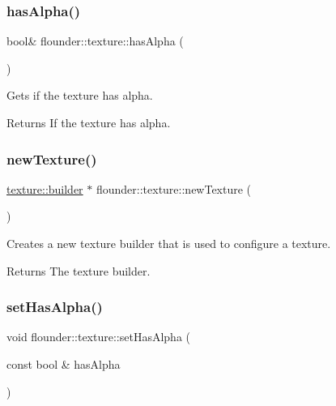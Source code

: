 \subsubsection{\texorpdfstring{has\+Alpha()}{hasAlpha()}}
{\footnotesize\ttfamily bool\& flounder\+::texture\+::has\+Alpha (\begin{DoxyParamCaption}{ }\end{DoxyParamCaption})\hspace{0.3cm}{\ttfamily [inline]}}



Gets if the texture has alpha. 

\begin{DoxyReturn}{Returns}
If the texture has alpha. 
\end{DoxyReturn}
\mbox{\label{classflounder_1_1texture_af6311afbba328755cd0ff6a7839e9172}} 
\subsubsection{\texorpdfstring{new\+Texture()}{newTexture()}}
{\footnotesize\ttfamily \hyperlink{classflounder_1_1texture_1_1builder}{texture\+::builder} $\ast$ flounder\+::texture\+::new\+Texture (\begin{DoxyParamCaption}{ }\end{DoxyParamCaption})\hspace{0.3cm}{\ttfamily [static]}}



Creates a new texture builder that is used to configure a texture. 

\begin{DoxyReturn}{Returns}
The texture builder. 
\end{DoxyReturn}
\mbox{\label{classflounder_1_1texture_ac05209e3a9686903a336575ac71b8f0e}} 
\subsubsection{\texorpdfstring{set\+Has\+Alpha()}{setHasAlpha()}}
{\footnotesize\ttfamily void flounder\+::texture\+::set\+Has\+Alpha (\begin{DoxyParamCaption}\item[{const bool \&}]{has\+Alpha }\end{DoxyParamCaption})\hspace{0.3cm}{\ttfamily [inline]}}



